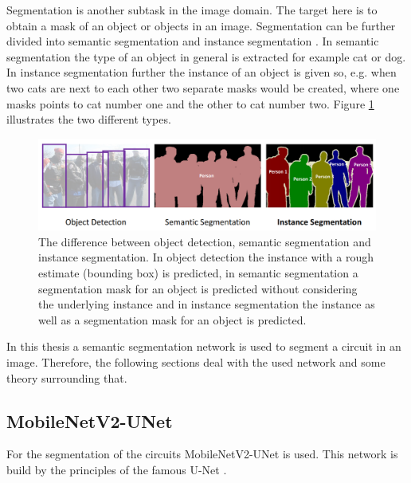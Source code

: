 \label{sec:segmentation}

Segmentation is another subtask in the image domain.
The target here is to obtain a mask of an object or objects in an image.
Segmentation can be further divided into semantic segmentation \cite{semantic_segmentation} and instance segmentation \cite{mask_rcnn}.
In semantic segmentation the type of an object in general is extracted for example cat or dog.
In instance segmentation further the instance of an object is given so, e.g. when two cats are next to each other two separate masks would be created, where one masks points to cat number one and the other to cat number two.
Figure \ref{fig:instance_vs_semantic} illustrates the two different types.

\begin{figure}
\begin{center}
    \includegraphics[width=16cm]{imgs/instance_vs_semantic_seg.png}
    \caption{The difference between object detection, semantic segmentation and instance segmentation. In object detection the instance with a rough estimate (bounding box) is predicted, in semantic segmentation a segmentation mask for an object is predicted without considering the underlying instance and in instance segmentation the instance as well as a segmentation mask for an object is predicted. \cite{instance_vs_semantic_fig}}
    \label{fig:instance_vs_semantic}
\end{center}
\end{figure}

In this thesis a semantic segmentation network is used to segment a circuit in an image.
Therefore, the following sections deal with the used network and some theory surrounding that.

\subsection{MobileNetV2-UNet}

For the segmentation of the circuits MobileNetV2-UNet \cite{mobile_unet} is used.
This network is build by the principles of the famous U-Net \cite{unet}.
